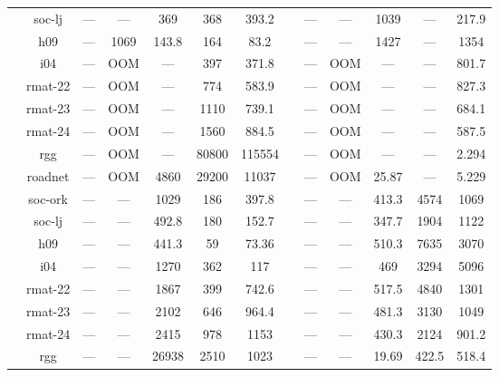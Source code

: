 \documentclass[format=acmsmall,review=false,screen=true]{acmart}
\begin{document}
\begin{table}[t]
{\begin{tabular}{*{13}{c}}
           & soc-lj  & ---   & ---      & 369       & 368   & 393.2   && ---   & ---      & 1039      & ---   & 217.9   \\
           & h09     & ---   & 1069     & 143.8     & 164   & 83.2    && ---   & ---      & 1427      & ---   & 1354    \\
           & i04     & ---   & OOM      & ---       & 397   & 371.8   && ---   & OOM      & ---       & ---   & 801.7   \\
           & rmat-22 & ---   & OOM      & ---       & 774   & 583.9   && ---   & OOM      & ---       & ---   & 827.3   \\
           & rmat-23 & ---   & OOM      & ---       & 1110  & 739.1   && ---   & OOM      & ---       & ---   & 684.1   \\
           & rmat-24 & ---   & OOM      & ---       & 1560  & 884.5   && ---   & OOM      & ---       & ---   & 587.5   \\
           & rgg     & ---   & OOM      & ---       & 80800 & 115554  && ---   & OOM      & ---       & ---   & 2.294   \\
           & roadnet & ---   & OOM      & 4860      & 29200 & 11037   && ---   & OOM      & 25.87     & ---   & 5.229   \\
      \midrule\parbox[t]{2mm}{}
           & soc-ork & ---   & ---      & 1029      & 186   & 397.8   && ---   & ---      & 413.3     & 4574  & 1069    \\
           & soc-lj  & ---   & ---      & 492.8     & 180   & 152.7   && ---   & ---      & 347.7     & 1904  & 1122    \\
           & h09     & ---   & ---      & 441.3     & 59    & 73.36   && ---   & ---      & 510.3     & 7635  & 3070    \\
           & i04     & ---   & ---      & 1270      & 362   & 117     && ---   & ---      & 469       & 3294  & 5096    \\
           & rmat-22 & ---   & ---      & 1867      & 399   & 742.6   && ---   & ---      & 517.5     & 4840  & 1301    \\
           & rmat-23 & ---   & ---      & 2102      & 646   & 964.4   && ---   & ---      & 481.3     & 3130  & 1049    \\
           & rmat-24 & ---   & ---      & 2415      & 978   & 1153    && ---   & ---      & 430.3     & 2124  & 901.2   \\
           & rgg     & ---   & ---      & 26938     & 2510  & 1023    && ---   & ---      & 19.69     & 422.5 & 518.4   \\

\end{tabular}}
\end{table}
\end{document}
